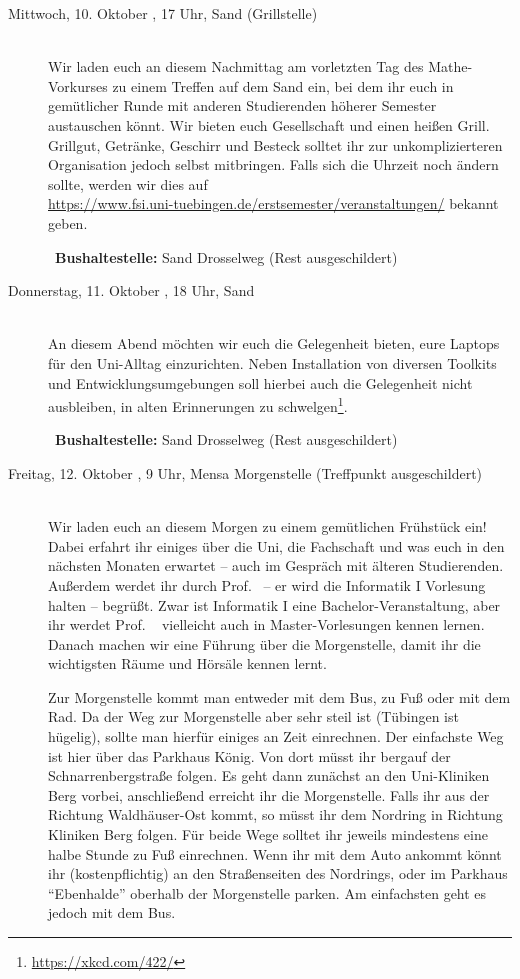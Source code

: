 \begin{description}
\item[Mittwoch, 10. Oktober \YEAR, 17 Uhr, Sand (Grillstelle)]\ \\
Wir laden euch an diesem Nachmittag am vorletzten Tag des Mathe-Vorkurses zu
einem Treffen auf dem Sand ein, bei dem ihr euch in gemütlicher Runde mit
anderen Studierenden höherer Semester austauschen könnt. Wir bieten euch
Gesellschaft und einen heißen Grill. Grillgut, Getränke, Geschirr und Besteck solltet ihr zur unkomplizierteren Organisation jedoch selbst mitbringen.
Falls sich die Uhrzeit noch ändern sollte, werden wir dies auf \\ \url{https://www.fsi.uni-tuebingen.de/erstsemester/veranstaltungen/} bekannt geben.

~\textbf{Bushaltestelle:} Sand Drosselweg (Rest ausgeschildert)

\item[Donnerstag, 11. Oktober \YEAR, 18 Uhr, Sand]\ \\
An diesem Abend möchten wir euch die Gelegenheit bieten, eure Laptops für den Uni-Alltag einzurichten. Neben Installation von diversen Toolkits und Entwicklungsumgebungen soll hierbei auch die Gelegenheit nicht ausbleiben, in alten Erinnerungen zu schwelgen\footnote{\url{https://xkcd.com/422/}}.

~\textbf{Bushaltestelle:} Sand Drosselweg (Rest ausgeschildert)


\item[Freitag, 12. Oktober \YEAR, 9 Uhr, Mensa Morgenstelle (Treffpunkt ausgeschildert)]\ \\
Wir laden euch an diesem Morgen zu einem gemütlichen Frühstück ein! Dabei erfahrt ihr einiges über die Uni, die Fachschaft und was euch in den nächsten Monaten erwartet -- auch im Gespräch mit älteren
Studierenden. Außerdem werdet ihr durch Prof. \Infoprof~-- er wird die Informatik I Vorlesung halten -- begrüßt.
\ifmaster Zwar ist Informatik I eine Bachelor-Veranstaltung, aber ihr werdet Prof. \Infoprof~ vielleicht auch in Master-Vorlesungen kennen lernen. \fi
Danach machen wir eine Führung über die Morgenstelle, damit ihr die wichtigsten Räume und Hörsäle kennen lernt.

Zur Morgenstelle kommt man entweder mit dem Bus, zu Fuß oder mit dem Rad. Da der Weg zur Morgenstelle aber sehr steil ist (Tübingen ist hügelig), sollte man hierfür einiges an Zeit einrechnen.
Der einfachste Weg ist hier über das Parkhaus König. Von dort müsst ihr bergauf der Schnarrenbergstraße folgen. Es geht dann zunächst an den Uni-Kliniken Berg vorbei, anschließend erreicht ihr die Morgenstelle. Falls ihr aus der Richtung Waldh\"auser-Ost kommt, so m\"usst ihr dem Nordring in Richtung Kliniken Berg folgen. Für beide Wege solltet ihr jeweils mindestens eine halbe Stunde zu Fuß einrechnen.
Wenn ihr mit dem Auto ankommt k\"onnt ihr (kostenpflichtig) an den Straßenseiten des Nordrings, oder im Parkhaus "`Ebenhalde"' oberhalb der Morgenstelle parken. Am einfachsten geht es jedoch mit dem Bus.


\end{description}
